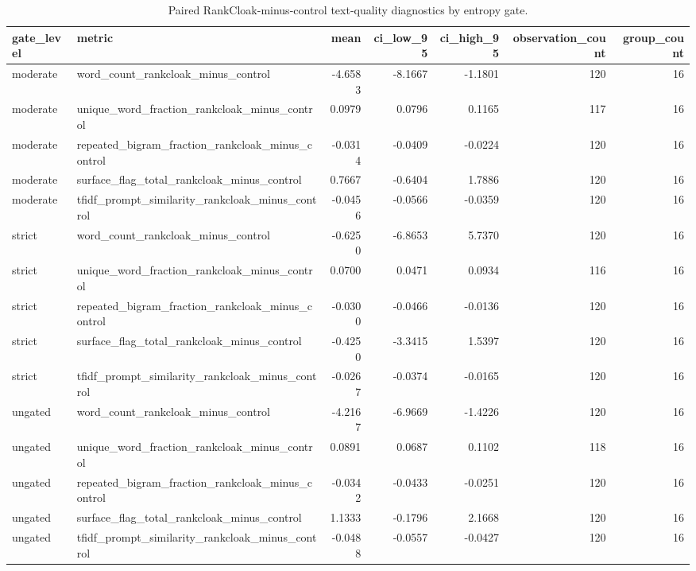 \begin{table}
\caption{Paired RankCloak-minus-control text-quality diagnostics by entropy gate.}
\label{tab:entropy-gate-quality}
\begin{tabular}{llrrrrr}
\toprule
gate\_level & metric & mean & ci\_low\_95 & ci\_high\_95 & observation\_count & group\_count \\
\midrule
moderate & word\_count\_rankcloak\_minus\_control & -4.6583 & -8.1667 & -1.1801 & 120 & 16 \\
moderate & unique\_word\_fraction\_rankcloak\_minus\_control & 0.0979 & 0.0796 & 0.1165 & 117 & 16 \\
moderate & repeated\_bigram\_fraction\_rankcloak\_minus\_control & -0.0314 & -0.0409 & -0.0224 & 120 & 16 \\
moderate & surface\_flag\_total\_rankcloak\_minus\_control & 0.7667 & -0.6404 & 1.7886 & 120 & 16 \\
moderate & tfidf\_prompt\_similarity\_rankcloak\_minus\_control & -0.0456 & -0.0566 & -0.0359 & 120 & 16 \\
strict & word\_count\_rankcloak\_minus\_control & -0.6250 & -6.8653 & 5.7370 & 120 & 16 \\
strict & unique\_word\_fraction\_rankcloak\_minus\_control & 0.0700 & 0.0471 & 0.0934 & 116 & 16 \\
strict & repeated\_bigram\_fraction\_rankcloak\_minus\_control & -0.0300 & -0.0466 & -0.0136 & 120 & 16 \\
strict & surface\_flag\_total\_rankcloak\_minus\_control & -0.4250 & -3.3415 & 1.5397 & 120 & 16 \\
strict & tfidf\_prompt\_similarity\_rankcloak\_minus\_control & -0.0267 & -0.0374 & -0.0165 & 120 & 16 \\
ungated & word\_count\_rankcloak\_minus\_control & -4.2167 & -6.9669 & -1.4226 & 120 & 16 \\
ungated & unique\_word\_fraction\_rankcloak\_minus\_control & 0.0891 & 0.0687 & 0.1102 & 118 & 16 \\
ungated & repeated\_bigram\_fraction\_rankcloak\_minus\_control & -0.0342 & -0.0433 & -0.0251 & 120 & 16 \\
ungated & surface\_flag\_total\_rankcloak\_minus\_control & 1.1333 & -0.1796 & 2.1668 & 120 & 16 \\
ungated & tfidf\_prompt\_similarity\_rankcloak\_minus\_control & -0.0488 & -0.0557 & -0.0427 & 120 & 16 \\
\bottomrule
\end{tabular}
\end{table}
